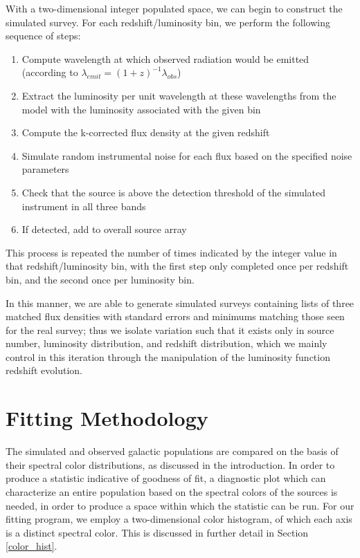 \documentclass[twocolumn,letterpaper,10pt]{article}
\begin{document}
With a two-dimensional integer populated space, we can begin to construct the simulated survey. For each redshift/luminosity bin, we perform the following sequence of steps:
\begin{enumerate}
\item Compute wavelength at which observed radiation would be emitted (according to $\lambda_{emit}=(1+z)^{-1}\lambda_{obs}$)
\item Extract the luminosity per unit wavelength at these wavelengths from the model with the luminosity associated with the given bin
\item Compute the k-corrected flux density at the given redshift
\item Simulate random instrumental noise for each flux based on the specified noise parameters
\item Check that the source is above the detection threshold of the simulated instrument in all three bands
\item If detected, add to overall source array
\end{enumerate}
This process is repeated the number of times indicated by the integer value in that redshift/luminosity bin, with the first step only completed once per redshift bin, and the second once per luminosity bin. 

In this manner, we are able to generate simulated surveys containing lists of three matched flux densities with standard errors and minimums matching those seen for the real survey; thus we isolate variation such that it exists only in source number, luminosity distribution, and redshift distribution, which we mainly control in this iteration through the manipulation of the luminosity function redshift evolution. 

\section{Fitting Methodology}

The simulated and observed galactic populations are compared on the basis of their spectral color distributions, as discussed in the introduction. In order to produce a statistic indicative of goodness of fit, a diagnostic plot which can characterize an entire population based on the spectral colors of the sources is needed, in order to produce a space within which the statistic can be run. For our fitting program, we employ a two-dimensional color histogram, of which each axis is a distinct spectral color. This is discussed in further detail in Section \ref{color_hist}. 
\end{document}
